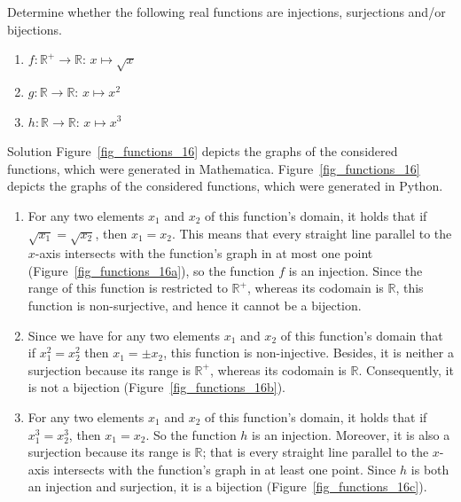\begin{example}
\label{exinjectief}
Determine whether the following real functions are injections, surjections and/or bijections.
\begin{multicols}{3}
\begin{enumerate}
\item $f:\mathbb{R}^+\to\mathbb{R}:\,x\mapsto \sqrt{x}$
\item $g:\mathbb{R}\to\mathbb{R}:\,x\mapsto x^2$
\item $h:\mathbb{R}\to\mathbb{R}:\,x\mapsto x^3$
\end{enumerate}
\end{multicols}
\vfill



Solution 
\ifmathematica
Figure~\ref{fig_functions_16} depicts the graphs of the considered functions, which were generated in Mathematica.
\fi
\ifpython
Figure~\ref{fig_functions_16} depicts the graphs of the considered functions, which were generated in Python.
\fi
\begin{enumerate}
\item For any two elements $x_1$ and $x_2$ of this function's domain, it holds that if $\sqrt{x_1}=\sqrt{x_2}$, then $x_1=x_2$. This means that every straight line parallel to the $x$-axis intersects with the function's graph in at most one point (Figure~\ref{fig_functions_16a}), so the function $f$ is an injection. Since the range of this function is restricted to $\mathbb{R}^+$, whereas its codomain is $\mathbb{R}$, this function is non-surjective, and hence it cannot be a bijection. 
\item Since we have for any two elements $x_1$ and $x_2$ of this function's domain that if $x_1^2=x_2^2$ then $x_1=\pm x_2$, this function is non-injective. Besides, it is neither a surjection because its range is $\mathbb{R}^+$, whereas its codomain is $\mathbb{R}$. Consequently, it is not a bijection (Figure~\ref{fig_functions_16b}). 
\item For any two elements $x_1$ and $x_2$ of this function's domain, it holds that if $x_1^3=x_2^3$, then $x_1=x_2$. So the function $h$ is an injection. Moreover, it is also a surjection because its range is $\mathbb{R}$; that is every straight line parallel to the $x$-axis intersects with the function's graph in at least one point. Since  $h$ is both an injection and surjection, it is a bijection (Figure~\ref{fig_functions_16c}).
\end{enumerate}



\end{example}
